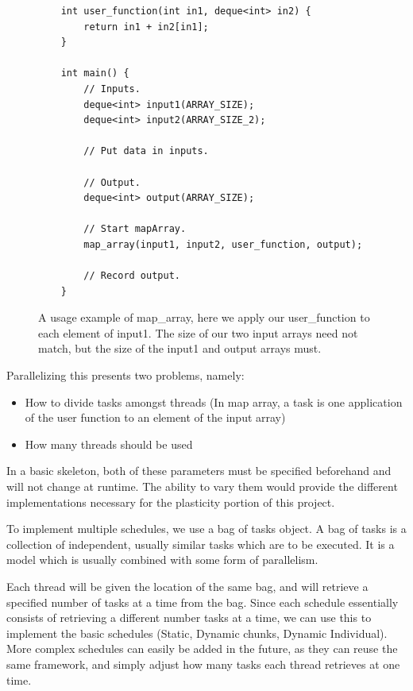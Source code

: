 \begin{figure}
	\begin{lstlisting}
	int user_function(int in1, deque<int> in2) {
		return in1 + in2[in1];
	}

	int main() {
		// Inputs.
		deque<int> input1(ARRAY_SIZE);
		deque<int> input2(ARRAY_SIZE_2);

		// Put data in inputs.

		// Output.
		deque<int> output(ARRAY_SIZE);

		// Start mapArray.
		map_array(input1, input2, user_function, output);

		// Record output.
	}
	\end{lstlisting}

	\caption{A usage example of map\_array, here we apply our user\_function to each element of input1. The size of our two input arrays need not match, but the size of the input1 and output arrays must.}
	\label{fig:implementation_map_array_usage_example}
\end{figure}



\begin{minipage}{\textwidth}

Parallelizing this presents two problems, namely:

\begin{itemize}
	\item How to divide tasks amongst threads (In map array, a task is one application of the user function to an element of the input array)
	\item How many threads should be used
\end{itemize}

\end{minipage}
 
In a basic skeleton, both of these parameters must be specified beforehand and will not change at runtime. The ability to vary them would provide the different implementations necessary for the plasticity portion of this project.

To implement multiple schedules, we use a bag of tasks object. A bag of tasks is a collection of independent, usually similar tasks which are to be executed. It is a model which is usually combined with some form of parallelism.

Each thread will be given the location of the same bag, and will retrieve a specified number of tasks at a time from the bag. Since each schedule essentially consists of retrieving a different number tasks at a time, we can use this to implement the basic schedules (Static, Dynamic chunks, Dynamic Individual). More complex schedules can easily be added in the future, as they can reuse the same framework, and simply adjust how many tasks each thread retrieves at one time.

